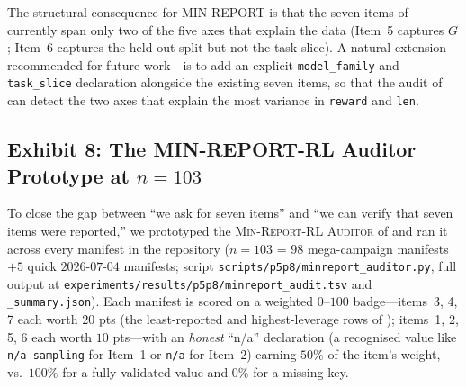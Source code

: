 The structural consequence for MIN-REPORT is that the seven items of
 currently span only two of the five axes that
explain the data (Item~5 captures $G$; Item~6 captures the held-out split
but not the task slice). A natural extension---recommended for future
work---is to add an explicit \texttt{model\_family} and
\texttt{task\_slice} declaration alongside the existing seven items, so
that the audit of  can detect the two
axes that explain the most variance in \texttt{reward} and \texttt{len}.

\subsection{Exhibit 8: The MIN-REPORT-RL Auditor Prototype at $n=103$}
\label{sec:p5-exhibit-auditor}
To close the gap between ``we ask for seven items'' and ``we can verify
that seven items were reported,'' we prototyped the
\textsc{Min-Report-RL Auditor} of  and ran it
across every manifest in the repository
($n=103$ = $98$ mega-campaign manifests $+5$ quick $2026$-$07$-$04$
manifests; script \texttt{scripts/p5p8/minreport\_auditor.py}, full
output at
\texttt{experiments/results/p5p8/minreport\_audit.tsv} and
\texttt{\_summary.json}). Each manifest is scored on a weighted $0$--$100$
badge---items~3, 4, 7 each worth $20$ pts (the least-reported and
highest-leverage rows of ); items~1, 2, 5, 6
each worth $10$ pts---with an \emph{honest} ``n/a'' declaration (a
recognised value like \texttt{n/a-sampling} for Item~1 or \texttt{n/a}
for Item~2) earning $50\%$ of the item's weight, vs.\ $100\%$ for a
fully-validated value and $0\%$ for a missing key.

